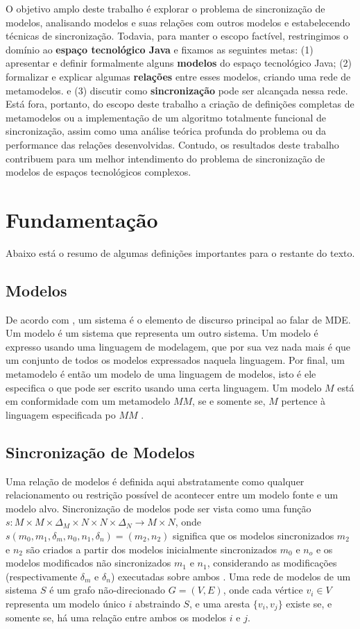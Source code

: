 \documentclass[cic,resumo-unibral]{iiufrgs}
\begin{document}
\begin{extendedsummary}
O objetivo amplo deste trabalho é explorar o problema de sincronização de modelos, analisando modelos e suas relações com outros modelos e estabelecendo técnicas de sincronização. Todavia, para manter o escopo factível, restringimos o domínio ao \textbf{espaço tecnológico Java} e fixamos as seguintes metas: (1) apresentar e definir formalmente alguns \textbf{modelos} do espaço tecnológico Java; (2) formalizar e explicar algumas \textbf{relações} entre esses modelos, criando uma rede de metamodelos. e (3) discutir como \textbf{sincronização} pode ser alcançada nessa rede. Está fora, portanto, do escopo deste trabalho a criação de definições completas de metamodelos ou a implementação de um algoritmo totalmente funcional de sincronização, assim como uma análise teórica profunda do problema ou da performance das relações desenvolvidas. Contudo, os resultados deste trabalho contribuem para um melhor intendimento do problema de sincronização de modelos de espaços tecnológicos complexos.

\section{Fundamentação}
Abaixo está o resumo de algumas definições importantes para o restante do texto.

\subsection{Modelos}
De acordo com \citet{favre2004foundations}, um sistema é o elemento de discurso principal ao falar de MDE. Um modelo é um sistema que representa um outro sistema. Um modelo é expresso usando uma linguagem de modelagem, que por sua vez nada mais é que um conjunto de todos os modelos expressados naquela linguagem. Por final, um metamodelo é então um modelo de uma linguagem de modelos, isto é ele especifica o que pode ser escrito usando uma certa linguagem. Um modelo $M$ está em conformidade com um metamodelo $MM$, se e somente se, $M$ pertence à linguagem especificada po $MM$ \cite{favre2004foundations2}.

\subsection{Sincronização de Modelos}
Uma relação de modelos é definida aqui abstratamente como qualquer relacionamento ou restrição possível de acontecer entre um modelo fonte e um modelo alvo. Sincronização de modelos pode ser vista como uma função $s : M \times M \times \Delta_M \times N \times N \times \Delta_N \rightarrow M \times N $, onde $s(m_0,m_1,\delta_m,n_0,n_1,\delta_n) = (m_2,n_2)$ significa que os modelos sincronizados $m_2$ e $n_2$ são criados a partir dos modelos inicialmente sincronizados $m_0$ e $n_o$ e os modelos modificados não sincronizados $m_1$ e $n_1$, considerando as modificações (respectivamente $\delta_m$ e $\delta_n$) executadas sobre ambos \cite{diskin2011model}. Uma rede de modelos de um sistema $S$ é um grafo não-direcionado $G = (V,E)$, onde cada vértice $v_i \in V$ representa um modelo único $i$ abstraindo $S$, e uma aresta $\{v_i, v_j\}$ existe se, e somente se, há uma relação entre ambos os modelos $i$ e $j$.


\end{extendedsummary}
\end{document}
